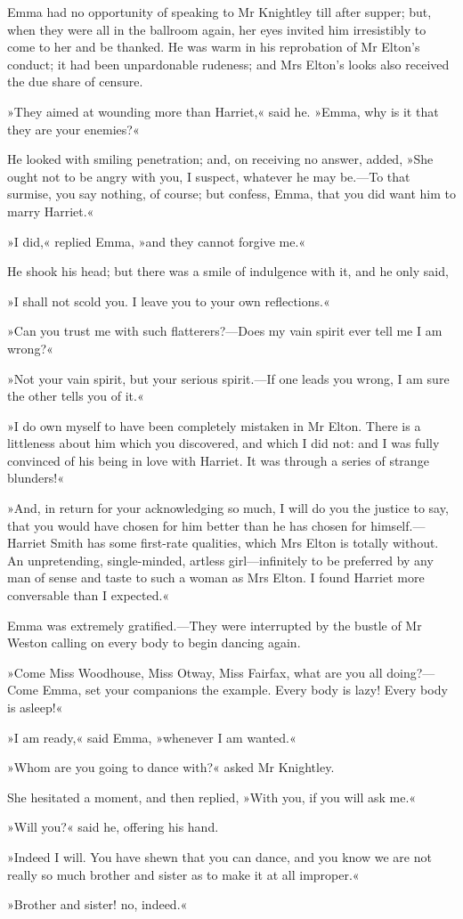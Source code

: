 Emma had no opportunity of speaking to Mr Knightley till after supper; but, when they were all in the ballroom again, her eyes invited him irresistibly to come to her and be thanked. He was warm in his reprobation of Mr Elton's conduct; it had been unpardonable rudeness; and Mrs Elton's looks also received the due share of censure.

»They aimed at wounding more than Harriet,« said he. »Emma, why is it that they are your enemies?«

He looked with smiling penetration; and, on receiving no answer, added, »She ought not to be angry with you, I suspect, whatever he may be.—To that surmise, you say nothing, of course; but confess, Emma, that you did want him to marry Harriet.«

»I did,« replied Emma, »and they cannot forgive me.«

He shook his head; but there was a smile of indulgence with it, and he only said,

»I shall not scold you. I leave you to your own reflections.«

»Can you trust me with such flatterers?—Does my vain spirit ever tell me I am wrong?«

»Not your vain spirit, but your serious spirit.—If one leads you wrong, I am sure the other tells you of it.«

»I do own myself to have been completely mistaken in Mr Elton. There is a littleness about him which you discovered, and which I did not: and I was fully convinced of his being in love with Harriet. It was through a series of strange blunders!«

»And, in return for your acknowledging so much, I will do you the justice to say, that you would have chosen for him better than he has chosen for himself.—Harriet Smith has some first-rate qualities, which Mrs Elton is totally without. An unpretending, single-minded, artless girl—infinitely to be preferred by any man of sense and taste to such a woman as Mrs Elton. I found Harriet more conversable than I expected.«

Emma was extremely gratified.—They were interrupted by the bustle of Mr Weston calling on every body to begin dancing again.

»Come Miss Woodhouse, Miss Otway, Miss Fairfax, what are you all doing?—Come Emma, set your companions the example. Every body is lazy! Every body is asleep!«

»I am ready,« said Emma, »whenever I am wanted.«

»Whom are you going to dance with?« asked Mr Knightley.

She hesitated a moment, and then replied, »With you, if you will ask me.«

»Will you?« said he, offering his hand.

»Indeed I will. You have shewn that you can dance, and you know we are not really so much brother and sister as to make it at all improper.«

»Brother and sister! no, indeed.«
